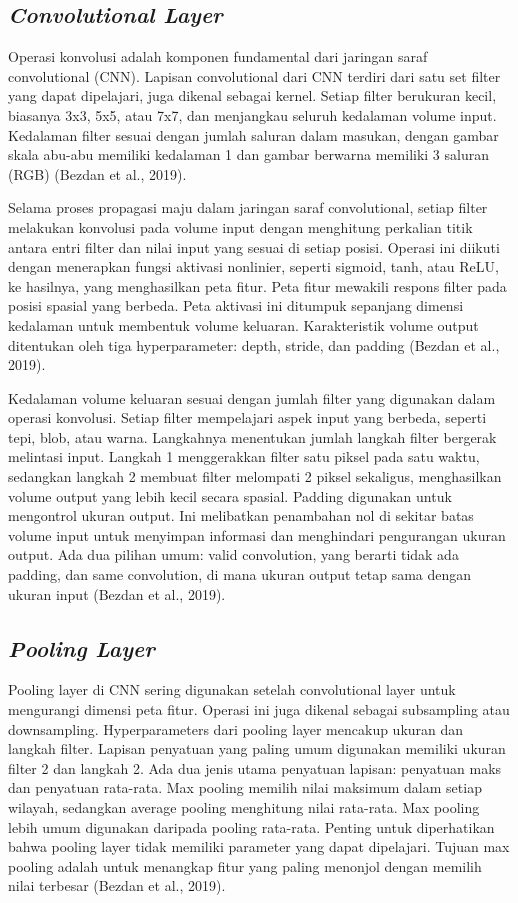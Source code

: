 \subsection{\emph{Convolutional Layer}}
\label{subsec:cnn}

Operasi konvolusi adalah komponen fundamental dari jaringan saraf convolutional (CNN). Lapisan convolutional dari CNN terdiri dari satu set filter yang dapat dipelajari, juga dikenal sebagai kernel. Setiap filter berukuran kecil, biasanya 3x3, 5x5, atau 7x7, dan menjangkau seluruh kedalaman volume input. Kedalaman filter sesuai dengan jumlah saluran dalam masukan, dengan gambar skala abu-abu memiliki kedalaman 1 dan gambar berwarna memiliki 3 saluran (RGB) (Bezdan et al., 2019). 

Selama proses propagasi maju dalam jaringan saraf convolutional, setiap filter melakukan konvolusi pada volume input dengan menghitung perkalian titik antara entri filter dan nilai input yang sesuai di setiap posisi. Operasi ini diikuti dengan menerapkan fungsi aktivasi nonlinier, seperti sigmoid, tanh, atau ReLU, ke hasilnya, yang menghasilkan peta fitur. Peta fitur mewakili respons filter pada posisi spasial yang berbeda. Peta aktivasi ini ditumpuk sepanjang dimensi kedalaman untuk membentuk volume keluaran. Karakteristik volume output ditentukan oleh tiga hyperparameter: depth, stride, dan padding (Bezdan et al., 2019).

Kedalaman volume keluaran sesuai dengan jumlah filter yang digunakan dalam operasi konvolusi. Setiap filter mempelajari aspek input yang berbeda, seperti tepi, blob, atau warna. Langkahnya menentukan jumlah langkah filter bergerak melintasi input. Langkah 1 menggerakkan filter satu piksel pada satu waktu, sedangkan langkah 2 membuat filter melompati 2 piksel sekaligus, menghasilkan volume output yang lebih kecil secara spasial. Padding digunakan untuk mengontrol ukuran output. Ini melibatkan penambahan nol di sekitar batas volume input untuk menyimpan informasi dan menghindari pengurangan ukuran output. Ada dua pilihan umum: valid convolution, yang berarti tidak ada padding, dan same convolution, di mana ukuran output tetap sama dengan ukuran input (Bezdan et al., 2019).

\subsection{\emph{Pooling Layer}}
\label{subsec:cnn}

Pooling layer di CNN sering digunakan setelah convolutional layer untuk mengurangi dimensi peta fitur. Operasi ini juga dikenal sebagai subsampling atau downsampling. Hyperparameters dari pooling layer mencakup ukuran dan langkah filter. Lapisan penyatuan yang paling umum digunakan memiliki ukuran filter 2 dan langkah 2. Ada dua jenis utama penyatuan lapisan: penyatuan maks dan penyatuan rata-rata. Max pooling memilih nilai maksimum dalam setiap wilayah, sedangkan average pooling menghitung nilai rata-rata. Max pooling lebih umum digunakan daripada pooling rata-rata. Penting untuk diperhatikan bahwa pooling layer tidak memiliki parameter yang dapat dipelajari. Tujuan max pooling adalah untuk menangkap fitur yang paling menonjol dengan memilih nilai terbesar (Bezdan et al., 2019).



